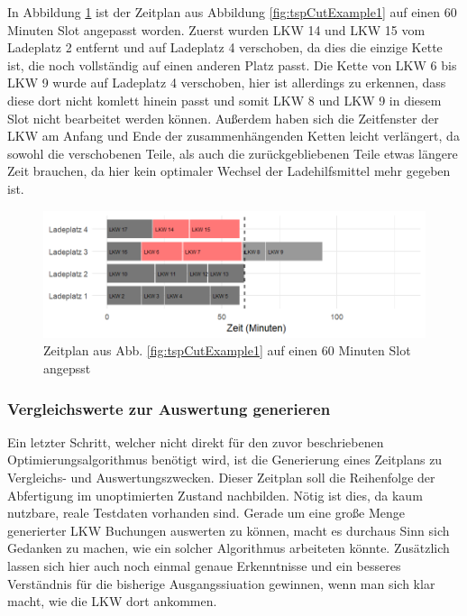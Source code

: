 In Abbildung \ref{fig:tspCutExample2} ist der Zeitplan aus Abbildung \ref{fig:tspCutExample1} auf einen 60 Minuten Slot angepasst worden. Zuerst wurden LKW 14 und LKW 15 vom Ladeplatz 2 entfernt und auf Ladeplatz 4 verschoben, da dies die einzige Kette ist, die noch vollständig auf einen anderen Platz passt. Die Kette von LKW 6 bis LKW 9 wurde auf Ladeplatz 4 verschoben, hier ist allerdings zu erkennen, dass diese dort nicht komlett hinein passt und somit LKW 8 und LKW 9 in diesem Slot nicht bearbeitet werden können. Außerdem haben sich die Zeitfenster der LKW am Anfang und Ende der zusammenhängenden Ketten leicht verlängert, da sowohl die verschobenen Teile, als auch die zurückgebliebenen Teile etwas längere Zeit brauchen, da hier kein optimaler Wechsel der Ladehilfsmittel mehr gegeben ist.

\begin{figure}[H]
    \centering
    \includegraphics[width=\textwidth]{images/timelines/timelineTspCutExample2.png}
    \caption{Zeitplan aus Abb. \ref{fig:tspCutExample1} auf einen 60 Minuten Slot angepsst}
    \label{fig:tspCutExample2}
\end{figure}


\subsubsection{Vergleichswerte zur Auswertung generieren}


Ein letzter Schritt, welcher nicht direkt für den zuvor beschriebenen Optimierungsalgorithmus benötigt wird, ist die Generierung eines Zeitplans zu Vergleichs- und Auswertungszwecken. Dieser Zeitplan soll die Reihenfolge der Abfertigung im unoptimierten Zustand nachbilden. Nötig ist dies, da kaum nutzbare, reale Testdaten vorhanden sind. Gerade um eine große Menge generierter LKW Buchungen auswerten zu können, macht es durchaus Sinn sich Gedanken zu machen, wie ein solcher Algorithmus arbeiteten könnte. Zusätzlich lassen sich hier auch noch einmal genaue Erkenntnisse und ein besseres Verständnis für die bisherige Ausgangssiuation gewinnen, wenn man sich klar macht, wie die LKW dort ankommen.

